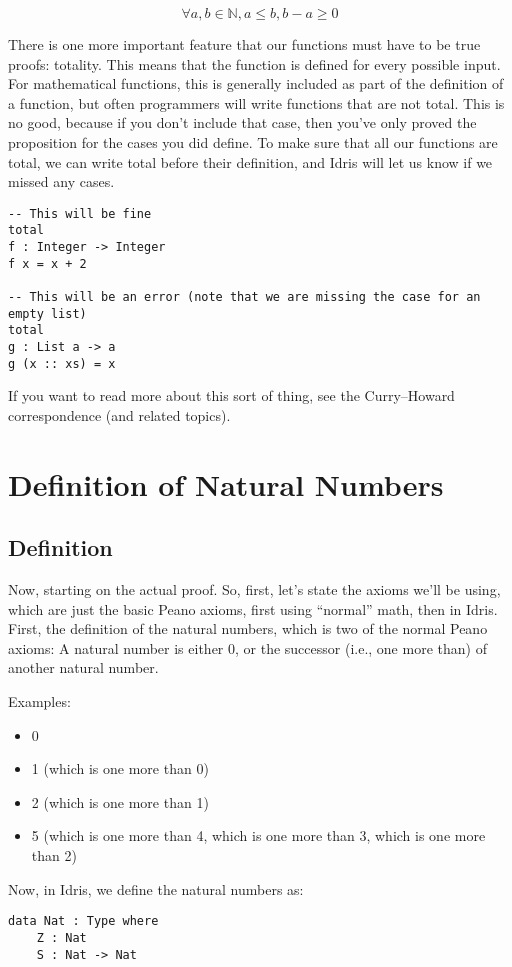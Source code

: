 \documentclass{article}
\begin{document}
\[
    \forall a, b \in \mathbb{N}, a \leq b, b - a \geq 0
\]

There is one more important feature that our functions must have to be true proofs: totality.
This means that the function is defined for every possible input.
For mathematical functions, this is generally included as part of the definition of a function, but often programmers will write functions that are not total.
This is no good, because if you don't include that case, then you've only proved the proposition for the cases you did define.
To make sure that all our functions are total, we can write total before their definition, and Idris will let us know if we missed any cases.

\begin{verbatim}
-- This will be fine
total
f : Integer -> Integer
f x = x + 2

-- This will be an error (note that we are missing the case for an empty list)
total
g : List a -> a
g (x :: xs) = x
\end{verbatim}

If you want to read more about this sort of thing, see the Curry--Howard correspondence (and related topics).

\section{Definition of Natural Numbers}
\subsection{Definition}
Now, starting on the actual proof.
So, first, let's state the axioms we'll be using, which are just the basic Peano axioms, first using ``normal'' math, then in Idris.
First, the definition of the natural numbers, which is two of the normal Peano axioms:
A natural number is either 0, or the successor (i.e., one more than) of another natural number.

Examples:
\begin{itemize}
    \item 0
    \item 1 (which is one more than 0)
    \item 2 (which is one more than 1)
    \item 5 (which is one more than 4, which is one more than 3, which is one more than 2)
\end{itemize}

Now, in Idris, we define the natural numbers as:
\begin{verbatim}
data Nat : Type where
    Z : Nat
    S : Nat -> Nat
\end{verbatim}
\end{document}
